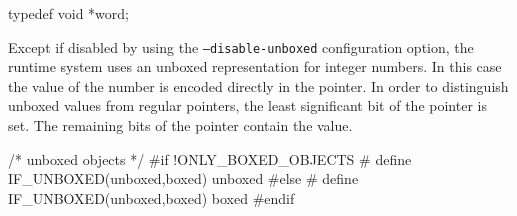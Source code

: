 typedef void *word;

\nwendcode{}\nwdocspar
Except if disabled by using the \texttt{--disable-unboxed}
configuration option, the runtime system uses an unboxed
representation for integer numbers. In this case the value of the
number is encoded directly in the pointer. In order to distinguish
unboxed values from regular pointers, the least significant bit of the
pointer is set. The remaining bits of the pointer contain the value.

\nwenddocs{}\plusendmoddef\nwstartdeflinemarkup{}\nwenddeflinemarkup
/* unboxed objects */
#if !ONLY_BOXED_OBJECTS
# define IF_UNBOXED(unboxed,boxed) unboxed
#else
# define IF_UNBOXED(unboxed,boxed) boxed
#endif

